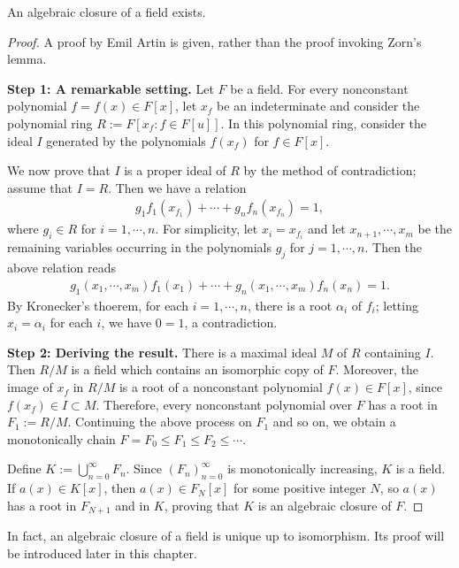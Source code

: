 \begin{thm}
    An algebraic closure of a field exists.
\end{thm}
\begin{proof}
    A proof by Emil Artin is given, rather than the proof invoking Zorn's lemma.

    \textbf{Step 1: A remarkable setting.}\newline\noindent
    Let $F$ be a field.
    For every nonconstant polynomial $f=f(x)\in F[x]$, let $x_f$ be an indeterminate and consider the polynomial ring $R:=F[x_f: f\in F[u]]$.
    In this polynomial ring, consider the ideal $I$ generated by the polynomials $f(x_f)$ for $f\in F[x]$.

    We now prove that $I$ is a proper ideal of $R$ by the method of contradiction; assume that $I=R$.
    Then we have a relation
    \begin{align*}
        g_1f_1(x_{f_1})+\cdots+g_nf_n(x_{f_n})=1,
    \end{align*}
    where $g_i\in R$ for $i=1, \cdots, n$.
    For simplicity, let $x_i=x_{f_i}$ and let $x_{n+1}, \cdots, x_m$ be the remaining variables occurring in the polynomials $g_j$ for $j=1, \cdots, n$.
    Then the above relation reads
    \begin{align*}
        g_1(x_1, \cdots, x_m)f_1(x_1)+\cdots+g_n(x_1, \cdots, x_m)f_n(x_n)=1.
    \end{align*}
    By Kronecker's thoerem, for each $i=1, \cdots, n$, there is a root $\alpha_i$ of $f_i$; letting $x_i=\alpha_i$ for each $i$, we have $0=1$, a contradiction.

    \textbf{Step 2: Deriving the result.}\newline\noindent
    There is a maximal ideal $M$ of $R$ containing $I$.
    Then $R/M$ is a field which contains an isomorphic copy of $F$.
    Moreover, the image of $x_f$ in $R/M$ is a root of a nonconstant polynomial $f(x)\in F[x]$, since $f(x_f)\in I\subset M$.
    Therefore, every nonconstant polynomial over $F$ has a root in $F_1:=R/M$.
    Continuing the above process on $F_1$ and so on, we obtain a monotonically chain $F=F_0\leq F_1\leq F_2\leq \cdots$.

    Define $K:=\bigcup_{n=0}^\infty F_n$.
    Since $(F_n)_{n=0}^\infty$ is monotonically increasing, $K$ is a field.
    If $a(x)\in K[x]$, then $a(x)\in F_N[x]$ for some positive integer $N$, so $a(x)$ has a root in $F_{N+1}$ and in $K$, proving that $K$ is an algebraic closure of $F$.
\end{proof}

In fact, an algebraic closure of a field is unique up to isomorphism.
Its proof will be introduced later in this chapter.